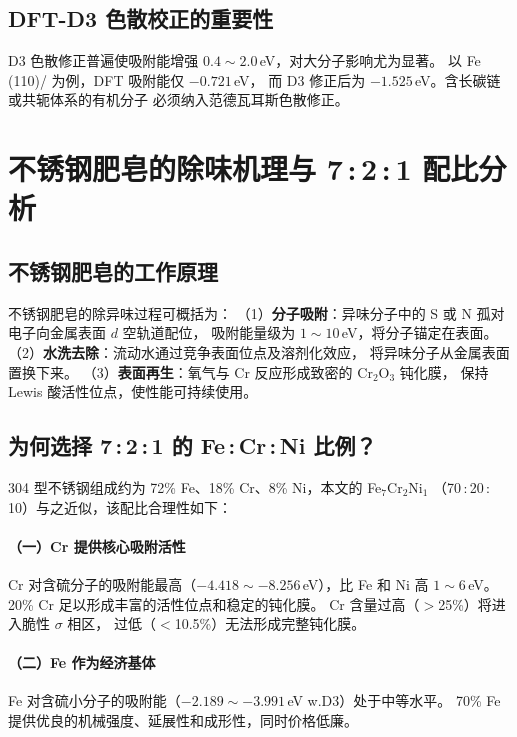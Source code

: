 \documentclass[12pt, a4paper]{article}
\begin{document}
\subsection{DFT-D3 色散校正的重要性}

D3 色散修正普遍使吸附能增强 $0.4\sim2.0$\,eV，对大分子影响尤为显著。
以 Fe\,(110)/ 为例，DFT 吸附能仅 $-0.721$\,eV，
而 D3 修正后为 $-1.525$\,eV。含长碳链或共轭体系的有机分子
必须纳入范德瓦耳斯色散修正。

\section{不锈钢肥皂的除味机理与 7\,:\,2\,:\,1 配比分析}

\subsection{不锈钢肥皂的工作原理}

不锈钢肥皂的除异味过程可概括为：
（1）\textbf{分子吸附}：异味分子中的 S 或 N 孤对电子向金属表面 $d$ 空轨道配位，
吸附能量级为 $1\sim10$\,eV，将分子锚定在表面。
（2）\textbf{水洗去除}：流动水通过竞争表面位点及溶剂化效应，
将异味分子从金属表面置换下来。
（3）\textbf{表面再生}：氧气与 Cr 反应形成致密的 $\mathrm{Cr_2O_3}$ 钝化膜，
保持 Lewis 酸活性位点，使性能可持续使用。

\subsection{为何选择 7\,:\,2\,:\,1 的 Fe\,:\,Cr\,:\,Ni 比例？}

304 型不锈钢组成约为 72\% Fe、18\% Cr、8\% Ni，本文的 Fe$_7$Cr$_2$Ni$_1$
（70\,:\,20\,:\,10）与之近似，该配比合理性如下：

\paragraph{（一）Cr 提供核心吸附活性}
Cr 对含硫分子的吸附能最高（$-4.418\sim-8.256$\,eV），比 Fe 和 Ni 高 $1\sim6$\,eV。
20\% Cr 足以形成丰富的活性位点和稳定的钝化膜。
Cr 含量过高（$>$25\%）将进入脆性 $\sigma$ 相区，
过低（$<$10.5\%）无法形成完整钝化膜。

\paragraph{（二）Fe 作为经济基体}
Fe 对含硫小分子的吸附能（$-2.189\sim-3.991$\,eV w.D3）处于中等水平。
70\% Fe 提供优良的机械强度、延展性和成形性，同时价格低廉。
\end{document}
